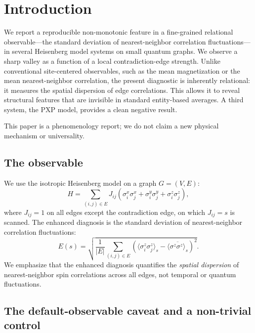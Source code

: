 \documentclass[pdflatex,sn-mathphys-num,iicol]{sn-jnl}
\begin{document}
\maketitle
\section{Introduction}

We report a reproducible non-monotonic feature in a fine-grained relational observable---the standard deviation of nearest-neighbor correlation fluctuations---in several Heisenberg model systems on small quantum graphs. We observe a sharp valley as a function of a local contradiction-edge strength. Unlike conventional site-centered observables, such as the mean magnetization or the mean nearest-neighbor correlation, the present diagnostic is inherently relational: it measures the spatial dispersion of edge correlations. This allows it to reveal structural features that are invisible in standard entity-based averages. A third system, the PXP model, provides a clean negative result.

This paper is a phenomenology report; we do not claim a new physical mechanism or universality.

\subsection{The observable}

We use the isotropic Heisenberg model on a graph $G=(V,E)$:
\begin{equation}
H = \sum_{(i,j)\in E} J_{ij}\left(\sigma_i^x\sigma_j^x + \sigma_i^y\sigma_j^y + \sigma_i^z\sigma_j^z\right),
\end{equation}
where $J_{ij}=1$ on all edges except the contradiction edge, on which $J_{ij}=s$ is scanned. The enhanced diagnosis is the standard deviation of nearest-neighbor correlation fluctuations:
\begin{equation}
E(s)=\sqrt{\frac{1}{|E|}\sum_{(i,j)\in E}\left(\langle\sigma_i^z\sigma_j^z\rangle_s-\overline{\langle\sigma^z\sigma^z\rangle_s}\right)^2}.
\end{equation}
We emphasize that the enhanced diagnosis quantifies the \emph{spatial dispersion} of nearest-neighbor spin correlations across all edges, not temporal or quantum fluctuations.

\subsection{The default-observable caveat and a non-trivial control}
\end{document}
